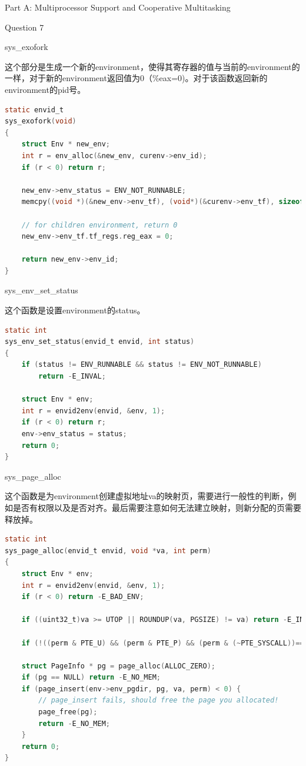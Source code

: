 \documentclass[GBK,winfonts,a4paper,10pt]{ctexart}
\begin{document}
\begin{section}{Part A: Multiprocessor Support and Cooperative Multitasking}
\begin{subsection}{Question 7}
\begin{subsubsection}{sys\_exofork}
\par
这个部分是生成一个新的environment，使得其寄存器的值与当前的environment的一样，对于新的environment返回值为0（\%eax=0)。对于该函数返回新的environment的pid号。
\begin{lstlisting}[language=C]
static envid_t
sys_exofork(void)
{
	struct Env * new_env;
	int r = env_alloc(&new_env, curenv->env_id);
	if (r < 0) return r;
	
	new_env->env_status = ENV_NOT_RUNNABLE;
	memcpy((void *)(&new_env->env_tf), (void*)(&curenv->env_tf), sizeof(struct Trapframe));
	
	// for children environment, return 0
	new_env->env_tf.tf_regs.reg_eax = 0;

	return new_env->env_id;
}
\end{lstlisting}
\end{subsubsection}

\begin{subsubsection}{sys\_env\_set\_status}
\par
这个函数是设置environment的status。
\begin{lstlisting}[language=C]
static int
sys_env_set_status(envid_t envid, int status)
{
	if (status != ENV_RUNNABLE && status != ENV_NOT_RUNNABLE) 
		return -E_INVAL;

	struct Env * env;
	int r = envid2env(envid, &env, 1);
	if (r < 0) return r;
	env->env_status = status;
	return 0;
}
\end{lstlisting}
\end{subsubsection}

\begin{subsubsection}{sys\_page\_alloc}
\par
这个函数是为environment创建虚拟地址va的映射页，需要进行一般性的判断，例如是否有权限以及是否对齐。最后需要注意如何无法建立映射，则新分配的页需要释放掉。
\begin{lstlisting}[language=C]
static int
sys_page_alloc(envid_t envid, void *va, int perm)
{
	struct Env * env;
	int r = envid2env(envid, &env, 1);
	if (r < 0) return -E_BAD_ENV;

	if ((uint32_t)va >= UTOP || ROUNDUP(va, PGSIZE) != va) return -E_INVAL;
	
	if (!((perm & PTE_U) && (perm & PTE_P) && (perm & (~PTE_SYSCALL))==0)) return -E_INVAL;

	struct PageInfo * pg = page_alloc(ALLOC_ZERO);
	if (pg == NULL) return -E_NO_MEM;
	if (page_insert(env->env_pgdir, pg, va, perm) < 0) {
		// page_insert fails, should free the page you allocated!  
		page_free(pg);
		return -E_NO_MEM;
	}
	return 0;
}
\end{lstlisting}
\end{subsubsection}


\end{subsection}
\end{section}
\end{document}
